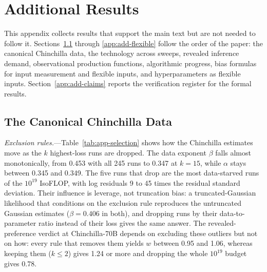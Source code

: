 
\section{Additional Results}\label{app:additional}
\setlength{\emergencystretch}{2em}%

This appendix collects results that support the main text but are not needed to follow it. Sections~\ref{app:add-chinchilla}
through \ref{app:add-flexible} follow the order of the paper: the canonical Chinchilla data, the technology across
sweeps, revealed inference demand, observational production functions, algorithmic progress, bias formulas for input
measurement and flexible inputs, and hyperparameters as flexible inputs. Section~\ref{app:add-claims} reports the verification register for the formal results.

\subsection{The Canonical Chinchilla Data}\label{app:add-chinchilla}

\emph{Exclusion rules.}---Table~\ref{tab:app-selection} shows how the Chinchilla estimates move as the $k$
highest-loss runs are dropped. The data exponent $\beta$ falls almost monotonically, from 0.453 with all 245 runs to
0.347 at $k=15$, while $\alpha$ stays between 0.345 and 0.349. The five runs that \citet{besiroglu2024chinchilla} drop
are the most data-starved runs of the $10^{19}$ IsoFLOP, with log residuals 9 to 45 times the residual standard
deviation. Their influence is leverage, not truncation bias: a truncated-Gaussian likelihood that conditions on the
exclusion rule reproduces the untruncated Gaussian estimates ($\beta=0.406$ in both), and dropping runs by their
data-to-parameter ratio instead of their loss gives the same answer. The revealed-preference verdict at
Chinchilla-70B depends on excluding these outliers but not on how: every rule that removes them yields $w$ between
0.95 and 1.06, whereas keeping them ($k\le2$) gives 1.24 or more and dropping the whole $10^{19}$ budget gives 0.78.

